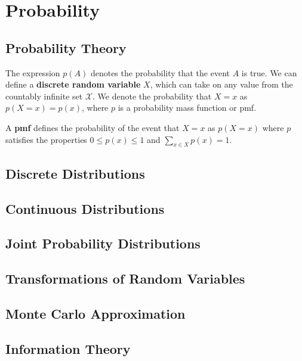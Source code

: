 \chapter{Probability}
\section{Probability Theory}
The expression \(p(A)\) denotes the probability that the event \(A\) is true. We can define a \textbf{discrete random variable} \(X\), which can take on any value from the countably infinite set \(\mathcal{X}\). We denote the probability that \(X=x\) as \(p(X=x)=p(x)\), where \(p\) is a probability mass function or pmf.

\begin{definition}
	A \textbf{pmf} defines the probability of the event that \(X=x\) as \(p(X=x)\)  where \(p\) satisfies the properties \(0 \leq p(x) \leq 1\) and \(\sum_{x\in X} p(x) = 1\). 
\end{definition}

\section{Discrete Distributions}
\section{Continuous Distributions}
\section{Joint Probability Distributions}
\section{Transformations of Random Variables}
\section{Monte Carlo Approximation}
\section{Information Theory}